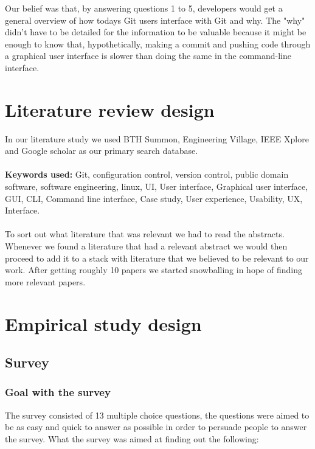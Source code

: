 \documentclass[a4paper,oneside]{bth} %
\begin{document}
			Our belief was that, by answering questions 1 to 5, developers would get a general overview of how todays Git users interface with Git and why. The "why" didn't have to be detailed for the information to be valuable because it might be enough to know that, hypothetically, making a commit and pushing code through a graphical user interface is slower than doing the same in the command-line interface.  
		 
			\section{Literature review design}
			In our literature study we used BTH Summon, Engineering Village, IEEE Xplore and Google scholar as our primary search database.\\\\
			\textbf{Keywords used:} Git, configuration control, version control, public domain software, software engineering, linux, UI, User interface, Graphical user interface, GUI, CLI, Command line interface, Case study, User experience, Usability, UX, Interface.
			\\\\
			To sort out what literature that was relevant we had to read the abstracts.
			Whenever we found a literature that had a relevant abstract we would then proceed to add it to a stack with literature that we believed to be relevant to our work.
			After getting roughly 10 papers we started snowballing in hope of finding more relevant papers.
			
			\section{Empirical study design}
			
				\subsection{Survey}
					\subsubsection*{Goal with the survey}
					The survey consisted of 13 multiple choice questions, the questions were aimed to be as easy and quick to answer as possible in order to persuade people to answer the survey. What the survey was aimed at finding out the following: 
					
\end{document}

